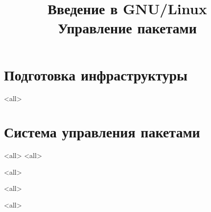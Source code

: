 

\title{Введение в GNU/Linux\\Управление пакетами}








\begin{frame}
	\frametitle{}
	\titlepage
	\vspace{-0.5cm}
	\begin{center}
	\end{center}
\end{frame}



\section{Подготовка инфраструктуры}
\mode<all>{}

\section{Система управления пакетами}

\mode<all>{}
\mode<all>{}

\mode<all>{}

\mode<all>{}

\mode<all>
